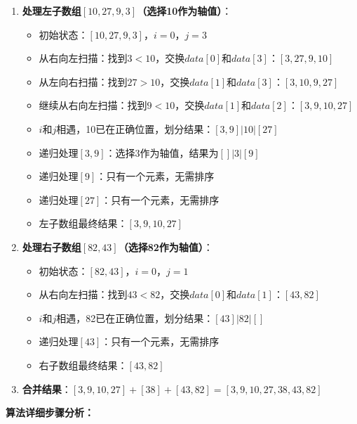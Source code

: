 \documentclass[12pt,a4paper]{amsart}
\begin{document}
\begin{enumerate}
\item \textbf{处理左子数组$[10, 27, 9, 3]$（选择10作为轴值）}：
    \begin{itemize}
    \item 初始状态：$[10, 27, 9, 3]$，$i=0$，$j=3$
    \item 从右向左扫描：找到$3 < 10$，交换$data[0]$和$data[3]$：$[3, 27, 9, 10]$
    \item 从左向右扫描：找到$27 > 10$，交换$data[1]$和$data[3]$：$[3, 10, 9, 27]$
    \item 继续从右向左扫描：找到$9 < 10$，交换$data[1]$和$data[2]$：$[3, 9, 10, 27]$
    \item $i$和$j$相遇，10已在正确位置，划分结果：$[3, 9] | 10 | [27]$
    \item 递归处理$[3, 9]$：选择3作为轴值，结果为$[] | 3 | [9]$
    \item 递归处理$[9]$：只有一个元素，无需排序
    \item 递归处理$[27]$：只有一个元素，无需排序
    \item 左子数组最终结果：$[3, 9, 10, 27]$
    \end{itemize}

\item \textbf{处理右子数组$[82, 43]$（选择82作为轴值）}：
    \begin{itemize}
    \item 初始状态：$[82, 43]$，$i=0$，$j=1$
    \item 从右向左扫描：找到$43 < 82$，交换$data[0]$和$data[1]$：$[43, 82]$
    \item $i$和$j$相遇，82已在正确位置，划分结果：$[43] | 82 | []$
    \item 递归处理$[43]$：只有一个元素，无需排序
    \item 右子数组最终结果：$[43, 82]$
    \end{itemize}

\item \textbf{合并结果}：$[3, 9, 10, 27] + [38] + [43, 82] = [3, 9, 10, 27, 38, 43, 82]$
\end{enumerate}

\textbf{算法详细步骤分析：}
\end{document}
